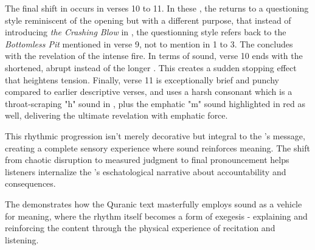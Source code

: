 The final shift in   occurs in verses 10 to 11. In these  , the   returns to a questioning style reminiscent of the opening  \newline but with a different purpose, that instead of introducing \textit{the Crashing Blow} in  , the questionning style refers back to   the \textit{Bottomless Pit} mentioned in verse 9, not to   mention in   1 to 3. The   concludes with the revelation of the intense fire. In terms of sound, verse 10 ends with the shortened, abrupt   instead of the longer  . This creates a sudden stopping effect that heightens tension. Finally, verse 11   is exceptionally brief and punchy compared to earlier descriptive verses, and uses a harsh consonant  which is a throat-scraping "h" sound in  , plus the emphatic "m" sound highlighted in red as well, delivering the ultimate revelation with emphatic force.

This rhythmic progression isn't merely decorative but integral to the 's \newline message, creating a complete sensory experience where sound reinforces meaning. The shift from chaotic disruption to measured judgment to final pronouncement helps listeners internalize the 's  eschatological narrative about accountability and consequences.

The   demonstrates how the Quranic text masterfully employs sound as a vehicle for meaning, where the rhythm itself becomes a form of exegesis - explaining and reinforcing the content through the physical experience of recitation and listening.

